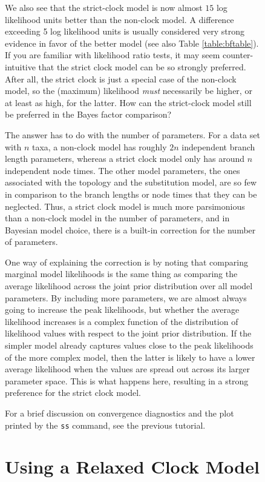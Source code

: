 \documentclass[12pt]{book}
\newcommand{\ttt}[1]{\texttt{#1}}
\begin{document}
\begin{figure}[h]
We also see that the strict-clock model is now almost $15$ log likelihood units better than the
non-clock model. A difference exceeding 5 log likelihood units is usually considered very strong
evidence in favor of the better model \citep{kass95} (see also Table \ref{table:bftable}). If you
are familiar with likelihood ratio tests, it may seem counter-intuitive that the strict clock model
can be so strongly preferred. After all, the strict clock is just a special case of the non-clock
model, so the (maximum) likelihood \emph{must} necessarily be higher, or at least as high, for the
latter. How can the strict-clock model still be preferred in the Bayes factor comparison?

The answer has to do with the number of parameters. For a data set with $n$ taxa, a non-clock model
has roughly $2n$ independent branch length parameters, whereas a strict clock model only has around
$n$ independent node times. The other model parameters, the ones associated with the topology and
the substitution model, are so few in comparison to the branch lengths or node times that they can
be neglected. Thus, a strict clock model is much more parsimonious than a non-clock model in the
number of parameters, and in Bayesian model choice, there is a built-in correction for the number
of parameters.

One way of explaining the correction is by noting that comparing marginal model likelihoods is the
same thing as comparing the average likelihood across the joint prior distribution over all model
parameters. By including more parameters, we are almost always going to increase the peak
likelihoods, but whether the average likelihood increases is a complex function of the distribution
of likelihood values with respect to the joint prior distribution. If the simpler model already
captures values close to the peak likelihoods of the more complex model, then the latter is likely
to have a lower average likelihood when the values are spread out across its larger parameter
space. This is what happens here, resulting in a strong preference for the strict clock model.

For a brief discussion on convergence diagnostics and the plot printed by the \ttt{ss} command,
see the previous tutorial.


\section{Using a Relaxed Clock Model}
\label{relaxedClock}


\end{figure}
\end{document}

